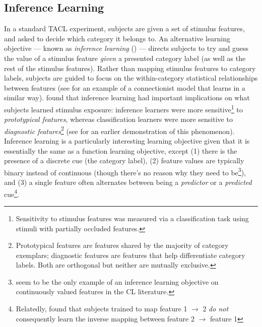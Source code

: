 \documentclass[12pt]{article}
\let\oldcite=\cite
\let\oldtextcite=\textcite
\renewcommand{\cite}[1]{\textcolor[rgb]{0, .121, .388}{\oldcite{#1}}}
\renewcommand{\textcite}[1]{\textcolor[rgb]{0, .121, .388}{\oldtextcite{#1}}}
\begin{document}
\subsection{Inference Learning}

In a standard TACL experiment, subjects are given a set of stimulus features, and asked to decide which category it belongs to. An alternative learning objective --- known as \emph{inference learning} (\cite{yamauchi1998category,chin2004diagnosticity}) --- directs subjects to try and guess the value of a stimulus feature \emph{given} a presented category label (as well as the rest of the stimulus features). Rather than mapping stimulus features to category labels, subjects are guided to focus on the within-category statistical relationships between features (see \cite{kurtz2007divergent} for an example of a connectionist model that learns in a similar way). \cite{chin2004diagnosticity} found that inference learning had important implications on what subjects learned stimulus exposure: inference learners were more sensitive\footnote{Sensitivity to stimulus features was measured via a classification task using stimuli with partially occluded features.} to \emph{prototypical features}, whereas classification learners were more sensitive to \emph{diagnostic features}\footnote{Prototypical features are features shared by the majority of category exemplars; diagnostic features are features that help differentiate category labels. Both are orthogonal but neither are mutually exclusive.} (see \cite{yamauchi1998category} for an earlier demonstration of this phenomenon). Inference learning is a particularly interesting learning objective given that it is essentially the same as a function learning objective, except (1) there is the presence of a discrete cue (the category label), (2) feature values are typically binary instead of continuous (though there's no reason why they need to be\footnote{\textcite{ell2020learning} seem to be the only example of an inference learning objective on continuously valued features in the CL literature.}), and (3) a single feature often alternates between being a \emph{predictor} or a \emph{predicted} cue\footnote{Relatedly, \textcite{surber1987formal} found that subjects trained to map feature 1 $\rightarrow$ 2 \emph{do not} consequently learn the inverse mapping between feature 2 $\rightarrow$ feature 1}. 
\end{document}
